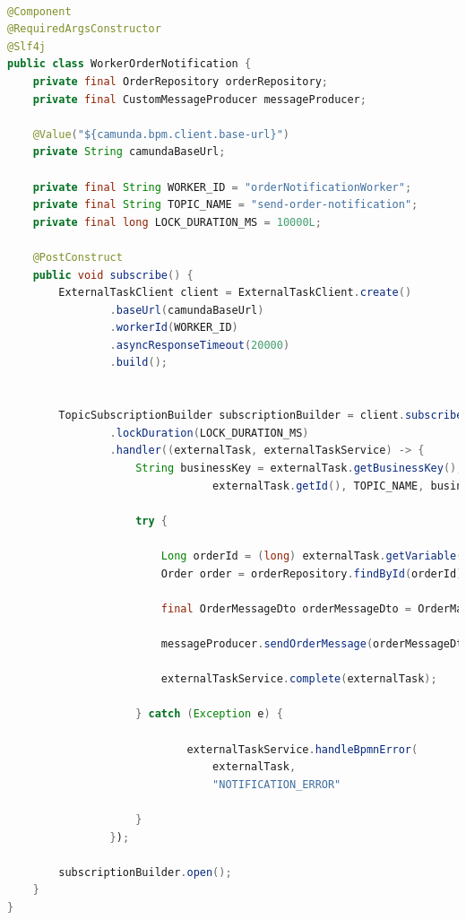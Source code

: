 \documentclass{article}
\begin{document}
\begin{lstlisting}[language=Java]

@Component
@RequiredArgsConstructor
@Slf4j
public class WorkerOrderNotification {
    private final OrderRepository orderRepository;
    private final CustomMessageProducer messageProducer;

    @Value("${camunda.bpm.client.base-url}")
    private String camundaBaseUrl;

    private final String WORKER_ID = "orderNotificationWorker";
    private final String TOPIC_NAME = "send-order-notification";
    private final long LOCK_DURATION_MS = 10000L;

    @PostConstruct
    public void subscribe() {
        ExternalTaskClient client = ExternalTaskClient.create()
                .baseUrl(camundaBaseUrl)
                .workerId(WORKER_ID)
                .asyncResponseTimeout(20000)
                .build();


        TopicSubscriptionBuilder subscriptionBuilder = client.subscribe(TOPIC_NAME)
                .lockDuration(LOCK_DURATION_MS)
                .handler((externalTask, externalTaskService) -> {
                    String businessKey = externalTask.getBusinessKey();
                                externalTask.getId(), TOPIC_NAME, businessKey);

                    try {
                        
                        Long orderId = (long) externalTask.getVariable("order_id");
                        Order order = orderRepository.findById(orderId).orElseThrow(() -> new RuntimeException("Order not found"));

                        final OrderMessageDto orderMessageDto = OrderMapper.toMessageDto(order);
                        
                        messageProducer.sendOrderMessage(orderMessageDto);

                        externalTaskService.complete(externalTask);

                    } catch (Exception e) {
                        
                            externalTaskService.handleBpmnError(
                                externalTask,
                                "NOTIFICATION_ERROR"                            );
                        
                    }
                });

        subscriptionBuilder.open();
    }
}    
\end{lstlisting}
\end{document}
